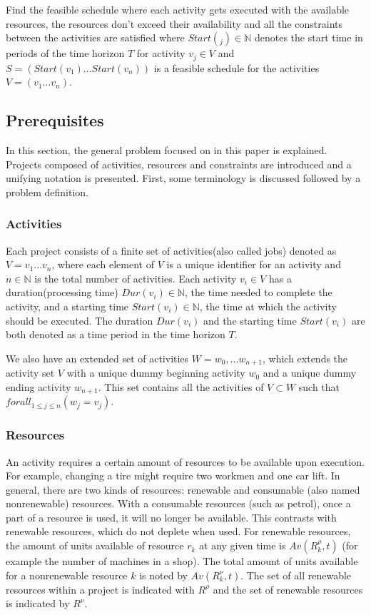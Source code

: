 \documentclass{article}
\newcommand{\renres}[0]{R^\rho} %
\newcommand{\conres}[0]{R^\nu} %
\newcommand{\av}[1]{\textit{Av}(#1)} %
\newcommand{\dur}[1]{\textit{Dur}(#1)} %
\newcommand{\start}[1]{\textit{Start}(#1)} %
\begin{document}
Find the feasible schedule where each activity gets executed with the available resources, the resources don't exceed their availability and all the constraints between the activities are satisfied where $\start{_j} \in \mathbb{N}$ denotes the start time in periods of the time horizon $T$ for activity $v_j \in V$ and
$S = (\start{v_1} \ldots \start{v_n})$ is a feasible schedule for the activities $V = (v_1 \ldots v_n)$.

\subsection{Prerequisites}
In this section, the general problem focused on in this paper is explained.
Projects composed of activities, resources and constraints are introduced and a unifying notation is presented.
First, some terminology is discussed followed by a problem definition.

\subsubsection{Activities}
Each project consists of a finite set of activities(also called jobs) denoted as $V = v_1 \ldots v_n$, where each element of $V$ is a unique identifier for an activity and $n \in \mathbb{N}$ is the total number of activities.
Each activity $v_i \in V$ has a duration(processing time) $\dur{v_i} \in \mathbb{N}$, the time needed to complete the activity, and a starting time $\start{v_i} \in \mathbb{N}$, the time at which the activity should be executed. The duration $\dur{v_i}$ and the starting time $\start{v_i}$ are both denoted as a time period in the time horizon $T$.

We also have an extended set of activities $W = w_0, \ldots w_{n+1}$, which extends the activity set $V$ with a unique dummy beginning activity $w_0$ and a unique dummy ending activity $w_{n+1}$. This set contains all the activities of $V \subset W$ such that $forall_{1 \leq j \leq n}(w_j = v_j)$.

\subsubsection{Resources}
An activity requires a certain amount of resources to be available upon execution.
For example, changing a tire might require two workmen and one car lift.
In general, there are two kinds of resources: renewable and consumable (also named nonrenewable) resources.
With a consumable resources (such as petrol), once a part of a resource is used, it will no longer be available.
This contrasts with renewable resources, which do not deplete when used.
For renewable resources, the amount of units available of resource $r_k$ at any given time is $\av{\renres_k, t}$ (for example the number of machines in a shop).
The total amount of units available for a nonrenewable resource $k$ is noted by $\av{\conres_k, t}$.
The set of all renewable resources within a project is indicated with $\renres$ and the set of renewable resources is indicated by $\conres$. 
\end{document}
